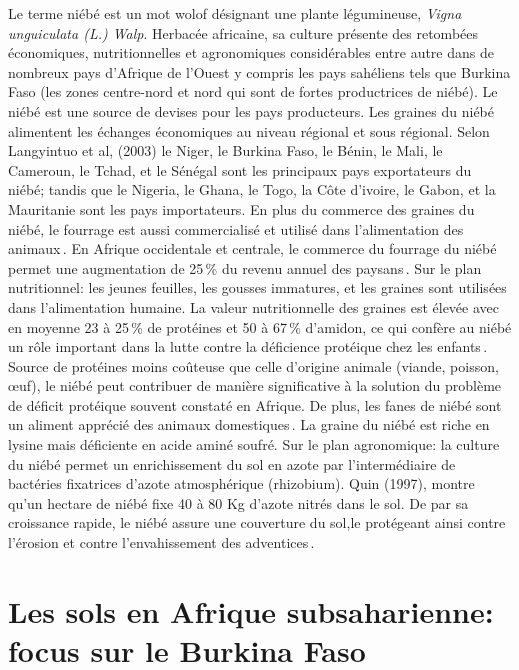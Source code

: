 \documentclass[a4paper,11pt]{article}
\begin{document}
Le terme niébé est un mot wolof désignant une plante légumineuse,
\emph{Vigna unguiculata (L.) Walp}. Herbacée africaine, sa culture
présente des retombées économiques, nutritionnelles et agronomiques
considérables entre autre dans de nombreux pays d'Afrique de l'Ouest
y compris les pays sahéliens tels que Burkina Faso (les zones
centre-nord et nord qui sont de fortes productrices de niébé).  Le
niébé est une source de devises pour les pays producteurs. Les graines
du niébé alimentent les échanges économiques au niveau régional et
sous régional. Selon Langyintuo et al, (2003) le Niger, le Burkina
Faso, le Bénin, le Mali, le Cameroun, le Tchad, et le Sénégal sont les
principaux pays exportateurs du niébé; tandis que le Nigeria, le
Ghana, le Togo, la Côte d’ivoire, le Gabon, et la Mauritanie sont les
pays importateurs. En plus du commerce des graines du niébé, le
fourrage est aussi commercialisé et utilisé dans l’alimentation des
animaux\,\cite{Langyintuo_2003}. En Afrique occidentale et centrale,
le commerce du fourrage du niébé permet une augmentation de 25\,\% du
revenu annuel des paysans\,\cite{Quin_1997}. Sur le plan nutritionnel:
les jeunes feuilles, les gousses immatures, et les graines sont
utilisées dans l’alimentation humaine. La valeur nutritionnelle des
graines est élevée avec en moyenne 23 à 25\,\% de protéines et 50 à
67\,\% d’amidon, ce qui confère au niébé un rôle important dans la
lutte contre la déficience protéique chez les
enfants\,\cite{Quin_1997}. Source de protéines moins coûteuse que
celle d’origine animale (viande, poisson, œuf), le niébé peut
contribuer de manière significative à la solution du problème de
déficit protéique souvent constaté en Afrique. De plus, les fanes de
niébé sont un aliment apprécié des animaux
domestiques\,\cite{BAMBARA_2008}. La graine du niébé est riche en
lysine mais déficiente en acide aminé soufré. Sur le plan agronomique:
la culture du niébé permet un enrichissement du sol en azote par
l’intermédiaire de bactéries fixatrices d’azote atmosphérique
(rhizobium). Quin (1997), montre qu’un hectare de niébé fixe 40 à 80
Kg d’azote nitrés dans le sol. De par sa croissance rapide, le niébé
assure une couverture du sol,le protégeant ainsi contre l’érosion et
contre l’envahissement des adventices\,\cite{Sawadogo_2009}.

\section{Les sols en Afrique subsaharienne: focus sur le Burkina Faso}
\end{document}
